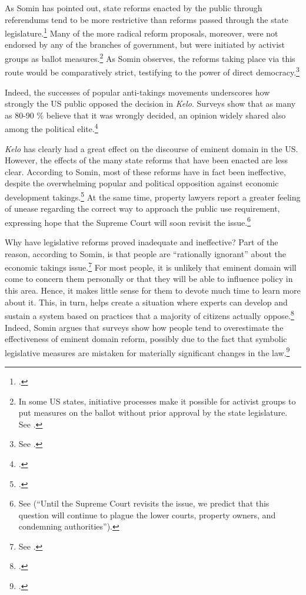 As Somin has pointed out, state reforms enacted by the public through referendums tend to be more restrictive than reforms passed through the state legislature.\footcite[2143]{somin09} Many of the more radical reform proposals, moreover, were not endorsed by any of the branches of government, but were initiated by activist groups as ballot measures.\footnote{In some US states, initiative processes make it possible for activist groups to put measures on the ballot without prior approval by the state legislature. See \cite[2148]{somin09}.} As Somin observes, the reforms taking place via this route would be comparatively strict, testifying to the power of direct democracy.\footnote{See \cite[2143-2149]{somin09}.}

Indeed, the successes of popular anti-takings movements  underscores how strongly the US public opposed the decision in {\it Kelo}. Surveys show that as many as 80-90 \% believe that it was wrongly decided, an opinion widely shared also among the political elite.\footcite[2109]{somin09} 

{\it Kelo} has clearly had a great effect on the discourse of eminent domain in the US. However, the effects of the many state reforms that have been enacted are less clear. According to Somin, most of these reforms have in fact been ineffective, despite the overwhelming popular and political opposition against economic development takings.\footcite[2170-2171]{somin09} At the same time, property lawyers report a greater feeling of unease regarding the correct way to approach the public use requirement, expressing hope that the Supreme Court will soon revisit the issue.\footnote{See \cite{murakami13} (``Until the Supreme Court revisits the issue, we predict that this question will continue to plague the lower courts, property owners, and condemning authorities'').} 

Why have legislative reforms proved inadequate and ineffective? Part of the reason, according to Somin, is that people are ``rationally ignorant'' about the economic takings issue.\footnote{See \cite[2170]{somin09}.} For most people, it is unlikely that eminent domain will come to concern them personally or that they will be able to influence policy in this area. Hence, it makes little sense for them to devote much time to learn more about it. This, in turn, helps create a situation where experts can develop and sustain a system based on practices that a majority of citizens actually oppose.\footcite[2163-2171]{somin09} Indeed, Somin argues that surveys show how people tend to overestimate the effectiveness of eminent domain reform, possibly due to the fact that symbolic legislative measures are mistaken for materially significant changes in the law.\footcite[2155-2157]{somin09}

